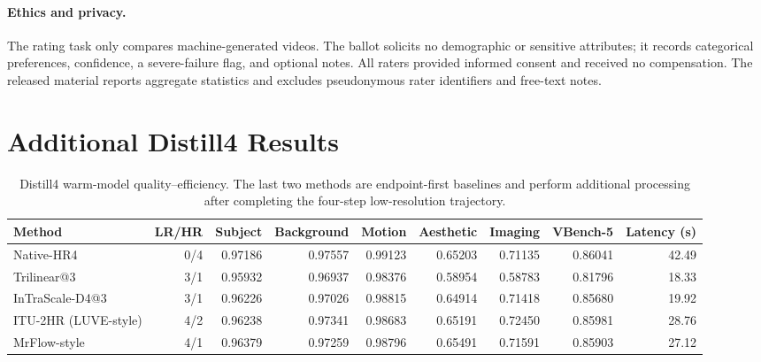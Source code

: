 \documentclass[letterpaper]{article}
\begin{document}
\paragraph{Ethics and privacy.}
The rating task only compares machine-generated videos.  The ballot solicits
no demographic or sensitive attributes; it records categorical preferences,
confidence, a severe-failure flag, and optional notes.  All raters provided
informed consent and received no compensation.  The released material reports
aggregate statistics and excludes pseudonymous rater identifiers and free-text
notes.

\FloatBarrier
\section{Additional Distill4 Results}

\begin{table}[t]
  \centering
  \small
  \setlength{\tabcolsep}{3.2pt}
  \begin{tabular}{lrrrrrrrr}
    \toprule
    Method & LR/HR & Subject & Background & Motion & Aesthetic & Imaging &
    VBench-5 & Latency (s) \\
    \midrule
    Native-HR4 & 0/4 & 0.97186 & 0.97557 & 0.99123 & 0.65203 & 0.71135 &
    0.86041 & 42.49 \\
    Trilinear@3 & 3/1 & 0.95932 & 0.96937 & 0.98376 & 0.58954 & 0.58783 &
    0.81796 & 18.33 \\
    InTraScale-D4@3 & 3/1 & 0.96226 & 0.97026 & 0.98815 & 0.64914 & 0.71418 &
    0.85680 & 19.92 \\
    ITU-2HR (LUVE-style) & 4/2 & 0.96238 & 0.97341 & 0.98683 & 0.65191 &
    0.72450 & 0.85981 & 28.76 \\
    MrFlow-style & 4/1 & 0.96379 & 0.97259 & 0.98796 & 0.65491 & 0.71591 &
    0.85903 & 27.12 \\
    \bottomrule
  \end{tabular}
  \caption{Distill4 warm-model quality--efficiency.  The last two methods are
  endpoint-first baselines and perform additional processing after completing
  the four-step low-resolution trajectory.}
  \label{tab:distill4-full}
\end{table}
\end{document}
